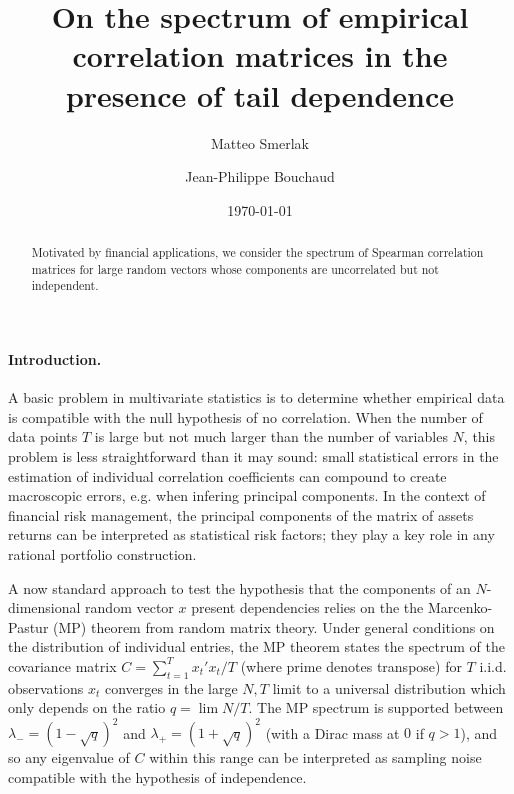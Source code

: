 \documentclass[
 prl,
 twocolumn,
 amsmath,
 amssymb,
 aps,
]{revtex4-2}
\begin{document}
\title{On the spectrum of empirical correlation matrices in the presence of tail dependence}

\author{Matteo Smerlak}


\author{Jean-Philippe Bouchaud}

\date{\today}
\begin{abstract}
    Motivated by financial applications, we consider the spectrum of Spearman correlation matrices for large random vectors whose components are uncorrelated but not independent. 

    
\end{abstract}
\maketitle

\paragraph*{Introduction.}
A basic problem in multivariate statistics is to determine whether empirical data is compatible with the null hypothesis of no correlation. 
When the number of data points $T$ is large but not much larger than the number of variables $N$, this problem is less straightforward than it may sound: small statistical errors in the estimation of individual correlation coefficients can compound to create macroscopic errors, e.g. when infering principal components.
In the context of financial risk management, the principal components of the matrix of assets returns can be interpreted as statistical risk factors; they play a key role in any rational portfolio construction. 

A now standard approach to test the hypothesis that the components of an $N$-dimensional random vector $x$ present dependencies relies on the the Marcenko-Pastur (MP) theorem from random matrix theory. 
Under general conditions on the distribution of individual entries, the MP theorem states the spectrum of the covariance matrix $C = \sum_{t=1}^T x_t' x_t/T$ (where prime denotes transpose) for $T$ i.i.d. observations $x_t$ converges in the large $N, T$ limit to a universal distribution which only depends on the ratio $q = \lim N/T$.
The MP spectrum is supported between $\lambda_- = (1-\sqrt{q})^2$ and $\lambda_+ = (1+\sqrt{q})^2$ (with a Dirac mass at $0$ if $q>1$), and so any eigenvalue of $C$ within this range can be interpreted as sampling noise compatible with the hypothesis of independence. 
\end{document}
